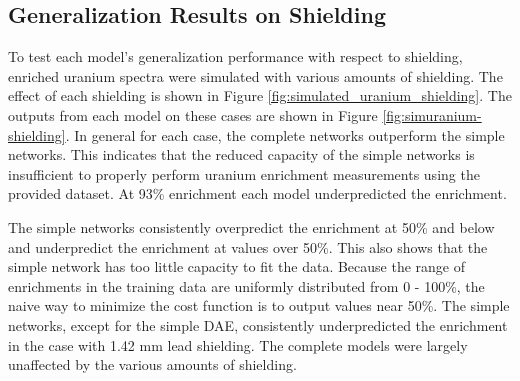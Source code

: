 \subsection{Generalization Results on Shielding}

To test each model's generalization performance with respect to shielding, enriched uranium spectra were simulated with various amounts of shielding. The effect of each shielding is shown in Figure \ref{fig:simulated_uranium_shielding}. The outputs from each model on these cases are shown in Figure \ref{fig:simuranium-shielding}. In general for each case, the complete networks outperform the simple networks. This indicates that the reduced capacity of the simple networks is insufficient to properly perform uranium enrichment measurements using the provided dataset. At 93\% enrichment each model underpredicted the enrichment.

The simple networks consistently overpredict the enrichment at 50\% and below and underpredict the enrichment at values over 50\%. This also shows that the simple network has too little capacity to fit the data. Because the range of enrichments in the training data are uniformly distributed from 0 - 100\%, the naive way to minimize the cost function is to output values near 50\%. The simple networks, except for the simple DAE, consistently underpredicted the enrichment in the case with 1.42 mm lead shielding. The complete models were largely unaffected by the various amounts of shielding.



